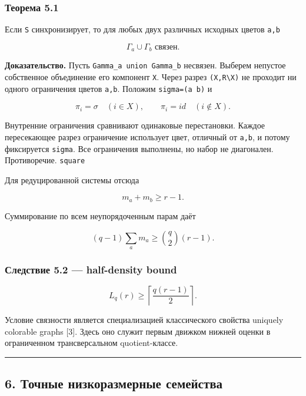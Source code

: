 \hypertarget{ux442ux435ux43eux440ux435ux43cux430-5.1}{%
\subsubsection{Теорема
5.1}\label{ux442ux435ux43eux440ux435ux43cux430-5.1}}

Если \texttt{S} синхронизирует, то для любых двух различных исходных
цветов \texttt{a,b}

\[
\boxed{\Gamma_a\cup\Gamma_b\text{ связен}.}
\tag{16}
\]

\textbf{Доказательство.} Пусть \texttt{Gamma\_a\ union\ Gamma\_b}
несвязен. Выберем непустое собственное объединение его компонент
\texttt{X}. Через разрез \texttt{(X,R\textbackslash{}X)} не проходит ни
одного ограничения цветов \texttt{a,b}. Положим \texttt{sigma=(a\ b)} и

\[
\pi_i=\sigma\quad(i\in X),
\qquad
\pi_i=id\quad(i\notin X).
\tag{17}
\]

Внутренние ограничения сравнивают одинаковые перестановки. Каждое
пересекающее разрез ограничение использует цвет, отличный от
\texttt{a,b}, и потому фиксируется \texttt{sigma}. Все ограничения
выполнены, но набор не диагонален. Противоречие. \texttt{square}

Для редуцированной системы отсюда

\[
m_a+m_b\ge r-1.
\tag{18}
\]

Суммирование по всем неупорядоченным парам даёт

\[
(q-1)\sum_a m_a\ge\binom q2(r-1).
\]

\hypertarget{ux441ux43bux435ux434ux441ux442ux432ux438ux435-5.2-half-density-bound}{%
\subsubsection{Следствие 5.2 --- half-density
bound}\label{ux441ux43bux435ux434ux441ux442ux432ux438ux435-5.2-half-density-bound}}

\[
\boxed{
L_q(r)\ge\left\lceil\frac{q(r-1)}2\right\rceil.
}
\tag{19}
\]

Условие связности является специализацией классического свойства
uniquely colorable graphs {[}3{]}. Здесь оно служит первым движком
нижней оценки в ограниченном трансверсальном quotient-классе.

\begin{center}\rule{0.5\linewidth}{0.5pt}\end{center}

\hypertarget{ux442ux43eux447ux43dux44bux435-ux43dux438ux437ux43aux43eux440ux430ux437ux43cux435ux440ux43dux44bux435-ux441ux435ux43cux435ux439ux441ux442ux432ux430}{%
\subsection{6. Точные низкоразмерные
семейства}\label{ux442ux43eux447ux43dux44bux435-ux43dux438ux437ux43aux43eux440ux430ux437ux43cux435ux440ux43dux44bux435-ux441ux435ux43cux435ux439ux441ux442ux432ux430}}

